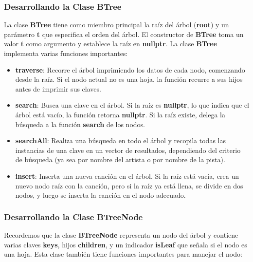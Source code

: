 \documentclass[12pt]{article}
\begin{document}
\begin{flushleft}
            \subsubsection{Desarrollando la Clase BTree }
            
                \noindent\hspace{4em}La clase \textbf{BTree} tiene como miembro principal la raíz del árbol (\textbf{root}) y un parámetro \textbf{t} que especifica el orden del árbol. El constructor de \textbf{BTree} toma un valor \textbf{t} como argumento y establece la raíz en \textbf{nullptr}. La clase \textbf{BTree} implementa varias funciones importantes:
                
                \begin{itemize}[left=4em]
                    \item \textbf{traverse}: Recorre el árbol imprimiendo los datos de cada nodo, comenzando desde la raíz. Si el nodo actual no es una hoja, la función recurre a sus hijos antes de imprimir sus claves.
                    \item \textbf{search}: Busca una clave en el árbol. Si la raíz es \textbf{nullptr}, lo que indica que el árbol está vacío, la función retorna \textbf{nullptr}. Si la raíz existe, delega la búsqueda a la función \textbf{search} de los nodos.
                    \item \textbf{searchAll}: Realiza una búsqueda en todo el árbol y recopila todas las instancias de una clave en un vector de resultados, dependiendo del criterio de búsqueda (ya sea por nombre del artista o por nombre de la pista).
                    \item \textbf{insert}: Inserta una nueva canción en el árbol. Si la raíz está vacía, crea un nuevo nodo raíz con la canción, pero si la raíz ya está llena, se divide en dos nodos, y luego se inserta la canción en el nodo adecuado.
                \end{itemize}
            
            \subsubsection{Desarrollando la Clase BTreeNode}
                
                \noindent\hspace{4em}Recordemos que la clase \textbf{BTreeNode} representa un nodo del árbol y contiene varias claves \textbf{keys}, hijos \textbf{children}, y un indicador \textbf{isLeaf} que señala si el nodo es una hoja. Esta clase también tiene funciones importantes para manejar el nodo:
                

\end{flushleft}
\end{document}
